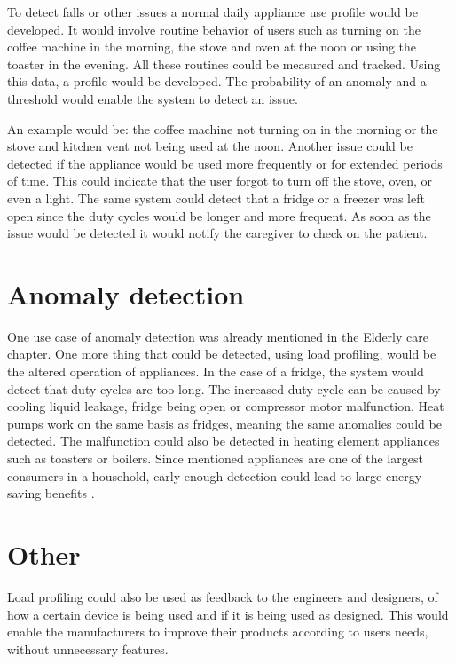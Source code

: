 \documentclass[
11pt, %
english, %
singlespacing, %
headsepline, %
]{MastersDoctoralThesis} %
\begin{document}
To detect falls or other issues a normal daily appliance use profile would be developed.
It would involve routine behavior of users such as turning on the coffee machine in the morning, the stove and oven at the noon or using the toaster in the evening.
All these routines could be measured and tracked. Using this data, a profile would be developed.
The probability of an anomaly and a threshold would enable the system to detect an issue.

An example would be: the coffee machine not turning on in the morning or the stove and kitchen vent not being used at the noon.
Another issue could be detected if the appliance would be used more frequently or for extended periods of time. 
This could indicate that the user forgot to turn off the stove, oven, or even a light. The same system could detect 
that a fridge or a freezer was left open since the duty cycles would be longer and more frequent. 
As soon as the issue would be detected it would notify the caregiver to check on the patient.

\section{Anomaly detection}

One use case of anomaly detection was already mentioned in the Elderly care chapter.
One more thing that could be detected, using load profiling, would be the altered operation of appliances.
In the case of a fridge, the system would detect that duty cycles are too long.
The increased duty cycle can be caused by cooling liquid leakage, fridge being open or compressor motor malfunction.
Heat pumps work on the same basis as fridges, meaning the same anomalies could be detected. 
The malfunction could also be detected in heating element appliances such as toasters or boilers. 
Since mentioned appliances are one of the largest consumers in a household,
early enough detection could lead to large energy-saving benefits \cite{NILMAD2019}.

\section{Other}

Load profiling could also be used as feedback to the engineers and designers,
of how a certain device is being used and if it is being used as designed. 
This would enable the manufacturers to improve their products according to 
users needs, without unnecessary features.
\end{document}
